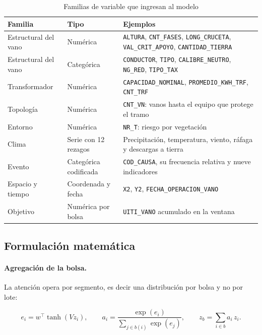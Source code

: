 \documentclass[11pt,a4paper]{article}
\begin{document}
\begin{table}[H]
\centering
\caption{Familias de variable que ingresan al modelo}
\label{tab:variables}
\footnotesize
\begin{tabularx}{\textwidth}{L{3.2cm} L{3.4cm} X}
\toprule
\textbf{Familia} & \textbf{Tipo} & \textbf{Ejemplos} \\
\midrule
Estructural del vano & Numérica & \texttt{ALTURA}, \texttt{CNT\_FASES}, \texttt{LONG\_CRUCETA}, \texttt{VAL\_CRIT\_APOYO}, \texttt{CANTIDAD\_TIERRA} \\
Estructural del vano & Categórica & \texttt{CONDUCTOR}, \texttt{TIPO}, \texttt{CALIBRE\_NEUTRO}, \texttt{NG\_RED}, \texttt{TIPO\_TAX} \\
Transformador & Numérica & \texttt{CAPACIDAD\_NOMINAL}, \texttt{PROMEDIO\_KWH\_TRF}, \texttt{CNT\_TRF} \\
Topología & Numérica & \texttt{CNT\_VN}: vanos hasta el equipo que protege el tramo \\
Entorno & Numérica & \texttt{NR\_T}: riesgo por vegetación \\
Clima & Serie con 12 rezagos & Precipitación, temperatura, viento, ráfaga y descargas a tierra \\
Evento & Categórica codificada & \texttt{COD\_CAUSA}, su frecuencia relativa y nueve indicadores \\
Espacio y tiempo & Coordenada y fecha & \texttt{X2}, \texttt{Y2}, \texttt{FECHA\_OPERACION\_VANO} \\
Objetivo & Numérica por bolsa & \texttt{UITI\_VANO} acumulado en la ventana \\
\bottomrule
\end{tabularx}
\end{table}

\subsection{Formulación matemática}

\paragraph{Agregación de la bolsa.} La atención opera por segmento, es decir una distribución
por bolsa y no por lote:

\begin{equation}
e_i = w^{\top}\tanh(V z_i), \qquad
a_i = \frac{\exp(e_i)}{\sum_{j \in b(i)} \exp(e_j)}, \qquad
z_b = \sum_{i \in b} a_i\, z_i .
\end{equation}
\end{document}
